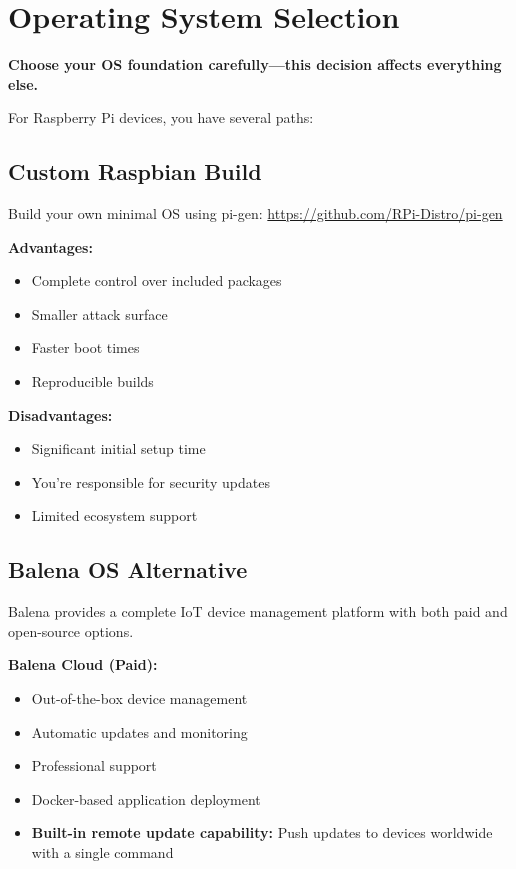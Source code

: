 \section{Operating System Selection}

\textbf{Choose your OS foundation carefully—this decision affects everything else.}

For Raspberry Pi devices, you have several paths:

\subsection{Custom Raspbian Build}

Build your own minimal OS using pi-gen: \url{https://github.com/RPi-Distro/pi-gen}

\textbf{Advantages:}
\begin{itemize}
\item Complete control over included packages
\item Smaller attack surface
\item Faster boot times
\item Reproducible builds
\end{itemize}

\textbf{Disadvantages:}
\begin{itemize}
\item Significant initial setup time
\item You're responsible for security updates
\item Limited ecosystem support
\end{itemize}

\subsection{Balena OS Alternative}

Balena provides a complete IoT device management platform with both paid and open-source options.

\textbf{Balena Cloud (Paid):}
\begin{itemize}
\item Out-of-the-box device management
\item Automatic updates and monitoring
\item Professional support
\item Docker-based application deployment
\item \textbf{Built-in remote update capability:} Push updates to devices worldwide with a single command
\end{itemize}

